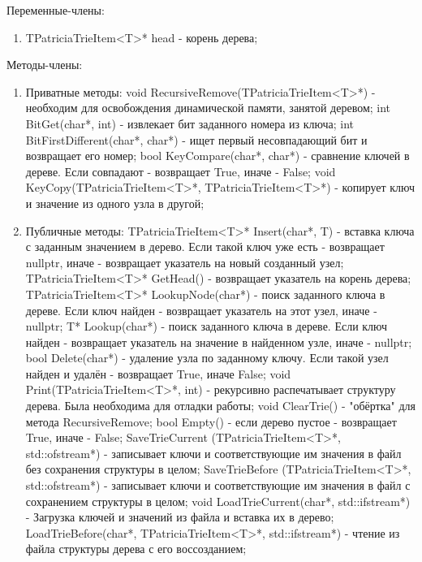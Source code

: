 \documentclass[12pt]{article}
\begin{document}
Переменные-члены:
\begin{enumerate}
	\item TPatriciaTrieItem<T>* head - корень дерева;
\end{enumerate}

Методы-члены:
\begin{enumerate}
	\item Приватные методы:
		\subitem void RecursiveRemove(TPatriciaTrieItem<T>*) - необходим для освобождения динамической памяти, занятой деревом;
		\subitem int BitGet(char*, int) - извлекает бит заданного номера из ключа;
		\subitem int BitFirstDifferent(char*, char*) - ищет первый несовпадающий бит и возвращает его номер;
		\subitem bool KeyCompare(char*, char*) - сравнение ключей в дереве. Если совпадают - возвращает True, иначе - False;
		\subitem void KeyCopy(TPatriciaTrieItem<T>*, TPatriciaTrieItem<T>*) - копирует ключ и значение из одного узла в другой;
	\item Публичные методы:
		\subitem TPatriciaTrieItem<T>* Insert(char*, T) - вставка ключа с заданным значением в дерево. Если такой ключ уже есть - возвращает nullptr, иначе - возвращает указатель на новый созданный узел;
		\subitem TPatriciaTrieItem<T>* GetHead() - возвращает указатель на корень дерева;
		\subitem TPatriciaTrieItem<T>* LookupNode(char*) - поиск заданного ключа в дереве. Если ключ найден - возвращает указатель на этот узел, иначе - nullptr;
		\subitem T* Lookup(char*) - поиск заданного ключа в дереве. Если ключ найден - возвращает указатель на значение в найденном узле, иначе - nullptr;
		\subitem bool Delete(char*) - удаление узла по заданному ключу. Если такой узел найден и удалён - возвращает True, иначе False;
		\subitem void Print(TPatriciaTrieItem<T>*, int) - рекурсивно распечатывает структуру дерева. Была необходима для отладки работы;
		\subitem void ClearTrie() - "обёртка" для метода RecursiveRemove;
		\subitem bool Empty() - если дерево пустое - возвращает True, иначе - False;
		\subitem SaveTrieCurrent (TPatriciaTrieItem<T>*, std::ofstream*) - записывает ключи и соответствующие им значения в файл без сохранения структуры в целом;
		\subitem SaveTrieBefore (TPatriciaTrieItem<T>*, std::ofstream*) - записывает ключи и соответствующие им значения в файл с сохранением структуры в целом;
		\subitem void LoadTrieCurrent(char*, std::ifstream*) - Загрузка ключей и значений из файла и вставка их в дерево;
		\subitem LoadTrieBefore(char*, TPatriciaTrieItem<T>*, std::ifstream*) - чтение из файла структуры дерева с его воссозданием;
\end{enumerate}
\end{document}
